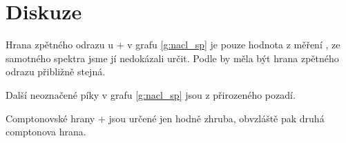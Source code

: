 \section*{Diskuze}


Hrana zpětného odrazu u + v grafu \ref{g:nacl_sp} je pouze hodnota z měření , ze samotného spektra jsme jí nedokázali určit. Podle \cite{skripta} by měla být hrana zpětného odrazu přibližně stejná.

Další neoznačené píky v grafu \ref{g:nacl_sp} jsou z přirozeného pozadí.

Comptonovské hrany + jsou určené jen hodně zhruba, obvzláště pak druhá comptonova hrana.